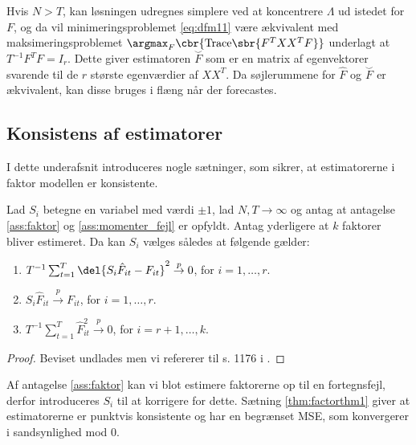 Hvis \(N > T\), kan løsningen udregnes simplere ved at koncentrere \(\Lambda\) ud istedet for \(F\), og da vil minimeringsproblemet \eqref{eq:dfm11} være ækvivalent med maksimeringsproblemet \(\argmax_F \cbr{ \text{Trace} \sbr{ F^T X X^T F}}\) underlagt at \(T^{-1} F^T F = I_r\).
Dette giver estimatoren \(\overset{\smile}{F}\) som er en matrix af egenvektorer svarende til de \(r\) største egenværdier af \(X X^T\).
Da søjlerummene for \(\hat{F}\) og \(\overset{\smile}{F}\) er ækvivalent, kan disse bruges i flæng når der forecastes.
%



\subsection{Konsistens af estimatorer}
I dette underafsnit introduceres nogle sætninger, som sikrer, at estimatorerne i faktor modellen er konsistente.
%
\begin{thm} \label{thm:factorthm1}
Lad \(S_i\) betegne en variabel med værdi \(\pm 1\), lad \(N, T \rightarrow \infty\) og antag at antagelse \ref{ass:faktor} og \ref{ass:momenter_fejl} er opfyldt.
Antag yderligere at \(k\) faktorer bliver estimeret.
Da kan \(S_i\) vælges således at følgende gælder:
\begin{enumerate}
\item \(T^{-1} \sum_{t=1}^T \del{S_i \hat{F}_{it} - F_{it}}^2 \overset{p}{\rightarrow} 0\), for \(i=1, \ldots, r\).
\item \(S_i \hat{F}_{it} \overset{p}{\rightarrow} F_{it}\), for \(i=1, \ldots, r\).
\item \(T^{-1} \sum_{t=1}^T \hat{F}_{it}^2 \overset{p}{\rightarrow} 0\), for \(i=r+1, \ldots, k\).
\end{enumerate}
\end{thm}
%
\begin{proof}
Beviset undlades men vi refererer til s. 1176 i \citep{stock_watson_2002a}.
\end{proof}
%
Af antagelse \ref{ass:faktor} kan vi blot estimere faktorerne op til en fortegnsfejl, derfor introduceres  \(S_i\) til at korrigere for dette.
Sætning \ref{thm:factorthm1} giver at estimatorerne er punktvis konsistente og har en begrænset MSE, som konvergerer i sandsynlighed mod 0.

